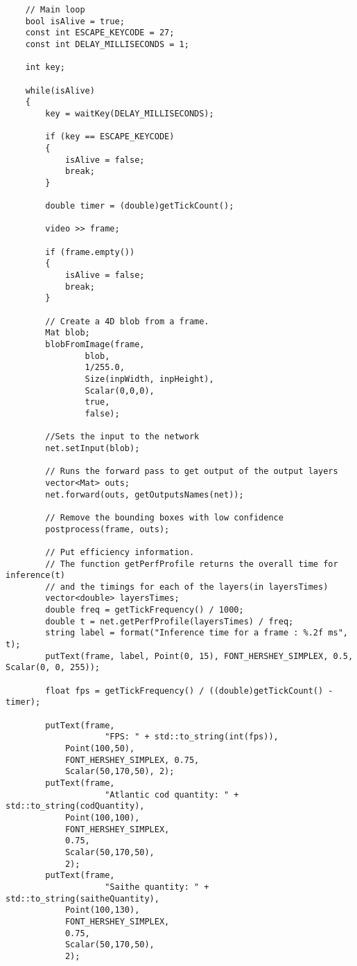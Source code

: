 \label{lst:mainloop}
\begin{verbatim}
    // Main loop
    bool isAlive = true;
    const int ESCAPE_KEYCODE = 27;
    const int DELAY_MILLISECONDS = 1;

    int key;

    while(isAlive)
    {
        key = waitKey(DELAY_MILLISECONDS);

        if (key == ESCAPE_KEYCODE)
        {
            isAlive = false;
            break;
        }

        double timer = (double)getTickCount();

        video >> frame;

        if (frame.empty())
        {
            isAlive = false;
            break;
        }

        // Create a 4D blob from a frame.
        Mat blob;
        blobFromImage(frame, 
        		blob,
        		1/255.0,
        		Size(inpWidth, inpHeight),
        		Scalar(0,0,0),
        		true,
        		false);

        //Sets the input to the network
        net.setInput(blob);

        // Runs the forward pass to get output of the output layers
        vector<Mat> outs;
        net.forward(outs, getOutputsNames(net));

        // Remove the bounding boxes with low confidence
        postprocess(frame, outs);

        // Put efficiency information.
        // The function getPerfProfile returns the overall time for inference(t)
        // and the timings for each of the layers(in layersTimes)
        vector<double> layersTimes;
        double freq = getTickFrequency() / 1000;
        double t = net.getPerfProfile(layersTimes) / freq;
        string label = format("Inference time for a frame : %.2f ms", t);
        putText(frame, label, Point(0, 15), FONT_HERSHEY_SIMPLEX, 0.5, Scalar(0, 0, 255));

        float fps = getTickFrequency() / ((double)getTickCount() - timer);

        putText(frame,
        		    "FPS: " + std::to_string(int(fps)),
		    Point(100,50),
		    FONT_HERSHEY_SIMPLEX, 0.75,
		    Scalar(50,170,50), 2);
        putText(frame,
        		    "Atlantic cod quantity: " + std::to_string(codQuantity),
		    Point(100,100),
		    FONT_HERSHEY_SIMPLEX,
		    0.75,
		    Scalar(50,170,50),
		    2);
        putText(frame,
        		    "Saithe quantity: " + std::to_string(saitheQuantity),
		    Point(100,130),
		    FONT_HERSHEY_SIMPLEX,
		    0.75,
		    Scalar(50,170,50),
		    2);


\end{verbatim}
